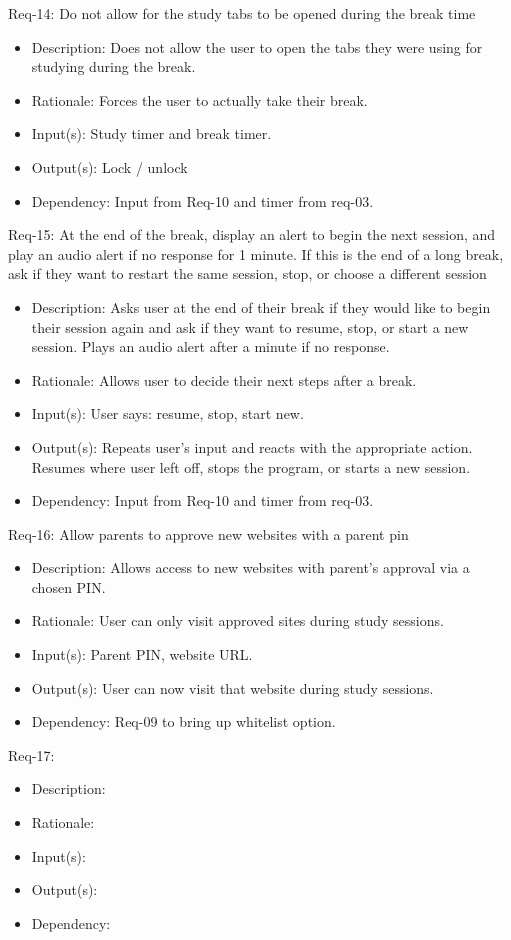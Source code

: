 \documentclass[12pt]{article}
\begin{document}
Req-14: Do not allow for the study tabs to be opened during the break time 
\begin{itemize}
    \item Description: Does not allow the user to open the tabs they were using for studying during the break. 
    \item Rationale: Forces the user to actually take their break. 
    \item Input(s): Study timer and break timer. 
    \item Output(s): Lock / unlock
    \item Dependency: Input from Req-10 and timer from req-03.
\end{itemize}
Req-15: At the end of the break, display an alert to begin the next session, and play an audio alert if no response for 1 minute. If this is the end of a long break, ask if they want to restart the same session, stop, or choose a different session 
\begin{itemize}
    \item Description:  Asks user at the end of their break if they would like to begin their session again and ask if they want to resume, stop, or start a new session. Plays an audio alert after a minute if no response.
    \item Rationale: Allows user to decide their next steps after a break. 
    \item Input(s): User says: resume, stop, start new. 
    \item Output(s): Repeats user’s input and reacts with the appropriate action. Resumes where user left off, stops the program, or starts a new session.
    \item Dependency:  Input from Req-10 and timer from req-03. 
\end{itemize}
Req-16: Allow parents to approve new websites with a parent pin 
\begin{itemize}
    \item Description: Allows access to new websites with parent’s approval via a chosen PIN.
    \item Rationale: User can only visit approved sites during study sessions.
    \item Input(s): Parent PIN, website URL.
    \item Output(s): User can now visit that website during study sessions.
    \item Dependency: Req-09 to bring up whitelist option.
\end{itemize}
Req-17: 
\begin{itemize}
    \item Description: 
    \item Rationale: 
    \item Input(s): 
    \item Output(s): 
    \item Dependency: 
\end{itemize}
\end{document}
